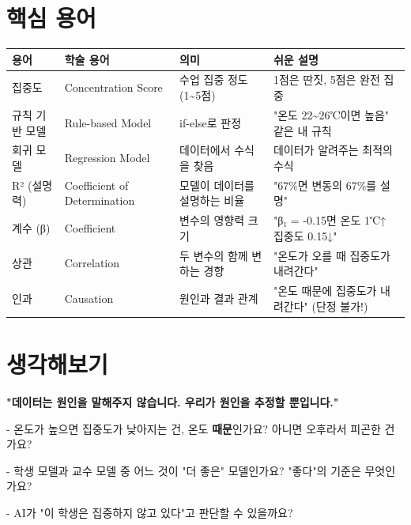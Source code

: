 \documentclass[11pt,a4paper]{article}
\begin{document}
\section*{ 핵심 용어}

\begin{center}
\renewcommand{\arraystretch}{1.4}
\begin{tabular}{|p{1.8cm}|p{3.7cm}|p{3.8cm}|p{5.7cm}|}
\hline
\rowcolor{tableheader}
\textbf{용어} & \textbf{학술 용어} & \textbf{의미} & \textbf{쉬운 설명} \\
\hline
집중도 & Concentration Score & 수업 집중 정도 (1\textasciitilde{}5점) & 1점은 딴짓, 5점은 완전 집중 \\
\hline
규칙 기반 모델 & Rule-based Model & if-else로 판정 & "온도 22\textasciitilde{}26℃이면 높음" 같은 내 규칙 \\
\hline
회귀 모델 & Regression Model & 데이터에서 수식을 찾음 & 데이터가 알려주는 최적의 수식 \\
\hline
R² (설명력) & Coefficient of Determination & 모델이 데이터를 설명하는 비율 & "67\%면 변동의 67\%를 설명" \\
\hline
계수 (β) & Coefficient & 변수의 영향력 크기 & "β₁ = -0.15면 온도 1℃↑ \textrightarrow{} 집중도 0.15↓" \\
\hline
상관 & Correlation & 두 변수의 함께 변하는 경향 & "온도가 오를 때 집중도가 내려간다" \\
\hline
인과 & Causation & 원인과 결과 관계 & "온도 때문에 집중도가 내려간다" (단정 불가!) \\
\hline
\end{tabular}
\end{center}


\section*{ 생각해보기}

\begin{tcolorbox}[tipbox]
\textbf{"데이터는 원인을 말해주지 않습니다. 우리가 원인을 추정할 뿐입니다."}

\vspace{0.3em}
- 온도가 높으면 집중도가 낮아지는 건, 온도 \textbf{때문}인가요? 아니면 오후라서 피곤한 건가요?

- 학생 모델과 교수 모델 중 어느 것이 "더 좋은" 모델인가요? "좋다"의 기준은 무엇인가요?

- AI가 "이 학생은 집중하지 않고 있다"고 판단할 수 있을까요?

\end{tcolorbox}
\end{document}
